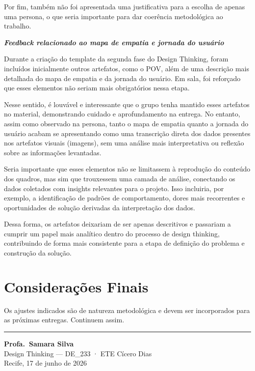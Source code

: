\documentclass[
  sigconf,
  nonacm, %
  language=portuguese
]{acmart}
\begin{document}
Por fim, também não foi apresentada uma justificativa para a escolha de apenas uma persona, o que seria importante para dar coerência metodológica ao trabalho.

\textit{\textbf{Feedback relacionado ao mapa de empatia e jornada do usuário}}

Durante a criação do template da segunda fase do Design Thinking, foram incluídos inicialmente outros artefatos, como o POV, além de uma descrição mais detalhada do mapa de empatia e da jornada do usuário. Em sala, foi reforçado que esses elementos não seriam mais obrigatórios nessa etapa.

Nesse sentido, é louvável e interessante que o grupo tenha mantido esses artefatos no material, demonstrando cuidado e aprofundamento na entrega. No entanto, assim como observado na persona, tanto o mapa de empatia quanto a jornada do usuário acabam se apresentando como uma transcrição direta dos dados presentes nos artefatos visuais (imagens), sem uma análise mais interpretativa ou reflexão sobre as informações levantadas.

Seria importante que esses elementos não se limitassem à reprodução do conteúdo dos quadros, mas sim que trouxessem uma camada de análise, conectando os dados coletados com insights relevantes para o projeto. Isso incluiria, por exemplo, a identificação de padrões de comportamento, dores mais recorrentes e oportunidades de solução derivadas da interpretação dos dados.

Dessa forma, os artefatos deixariam de ser apenas descritivos e passariam a cumprir um papel mais analítico dentro do processo de design thinking, contribuindo de forma mais consistente para a etapa de definição do problema e construção da solução.

\section{Considerações Finais}

Os ajustes indicados são de natureza metodológica e devem ser
incorporados para as próximas entregas.
Continuem assim.


\vspace{1.5em}
\noindent\rule{\linewidth}{0.4pt}

\begin{flushright}
\textbf{Profa.\ Samara Silva}\\
{\small\color{cmuted} Design Thinking --- DE\_233 · ETE Cícero Dias}\\
{\small\color{cmuted} Recife, 17 de junho de 2026}
\end{flushright}
\end{document}
